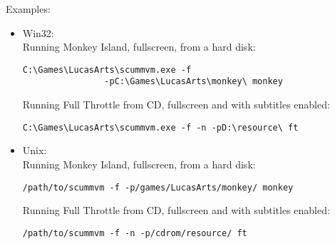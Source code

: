 Examples:
\begin{itemize}
\item Win32:\\
Running Monkey Island, fullscreen, from a hard disk:
\begin{verbatim}
C:\Games\LucasArts\scummvm.exe -f 
                -pC:\Games\LucasArts\monkey\ monkey
\end{verbatim}
  Running Full Throttle from CD, fullscreen and with subtitles enabled:
\begin{verbatim}
C:\Games\LucasArts\scummvm.exe -f -n -pD:\resource\ ft
\end{verbatim}
 \item Unix:\\
  Running Monkey Island, fullscreen, from a hard disk:
\begin{verbatim}
/path/to/scummvm -f -p/games/LucasArts/monkey/ monkey
\end{verbatim}
  Running Full Throttle from CD, fullscreen and with subtitles enabled:
\begin{verbatim}
/path/to/scummvm -f -n -p/cdrom/resource/ ft
\end{verbatim}
\end{itemize}

